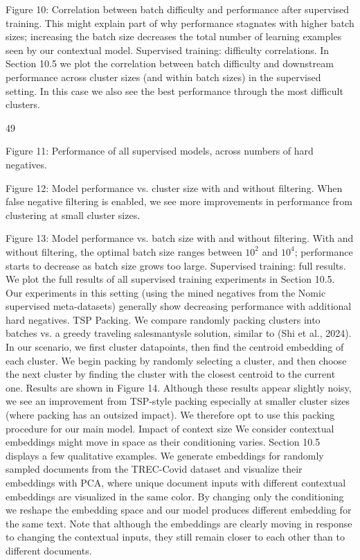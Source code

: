 Figure 10: Correlation between batch difficulty and performance after supervised training.
This might explain part of why performance stagnates with higher batch sizes; increasing the batch size decreases the total number of learning examples seen by our contextual model.
Supervised training: difficulty correlations. In Section 10.5 we plot the correlation between batch difficulty and downstream performance across cluster sizes (and within batch sizes) in the supervised setting. In this case we also see the best performance through the most difficult clusters.

49

Figure 11: Performance of all supervised models, across numbers of hard negatives.

Figure 12: Model performance vs. cluster size with and without filtering. When false negative filtering is enabled, we see more improvements in performance from clustering at small cluster sizes.

Figure 13: Model performance vs. batch size with and without filtering. With and without filtering, the optimal batch size ranges between \(10^{2}\) and \(10^{4}\); performance starts to decrease as batch size grows too large.
Supervised training: full results. We plot the full results of all supervised training experiments in Section 10.5. Our experiments in this setting (using the mined negatives from the Nomic supervised meta-datasets) generally show decreasing performance with additional hard negatives.
TSP Packing. We compare randomly packing clusters into batches vs. a greedy traveling salesmantysle solution, similar to (Shi et al., 2024). In our scenario, we first cluster datapoints, then find the centroid embedding of each cluster. We begin packing by randomly selecting a cluster, and then choose the next cluster by finding the cluster with the closest centroid to the current one. Results are shown in Figure 14. Although these results appear slightly noisy, we see an improvement from TSP-style packing especially at smaller cluster sizes (where packing has an outsized impact). We therefore opt to use this packing procedure for our main model.
Impact of context size We consider contextual embeddings might move in space as their conditioning varies. Section 10.5 displays a few qualitative examples. We generate embeddings for randomly sampled documents from the TREC-Covid dataset and visualize their embeddings with PCA, where unique document inputs with different contextual embeddings are visualized in the same color. By changing only the conditioning we reshape the embedding space and our model produces different embedding for the same text. Note that although the embeddings are clearly moving in response to changing the contextual inputs, they still remain closer to each other than to different documents.

